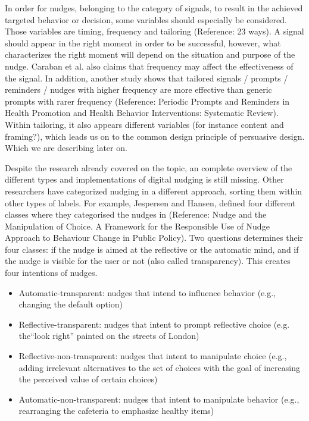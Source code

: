 In order for nudges, belonging to the category of signals, to result in the achieved targeted  behavior or decision, some variables should especially be considered. Those variables are timing, frequency and tailoring (Reference: 23 ways). A signal should appear in the right moment in order to be successful, however, what characterizes the right moment will depend on the situation and purpose of the nudge. Caraban et al. also claims that frequency may affect the effectiveness of the signal. In addition, another study shows that tailored signals / prompts / reminders / nudges with higher frequency are more effective than generic prompts with rarer frequency (Reference: Periodic Prompts and Reminders in Health Promotion and Health Behavior Interventions: Systematic Review). Within tailoring, it also appears different variables (for instance content and framing?), which leads us on to the common design principle of persuasive design. Which we are describing later on.  

Despite the research already covered on the topic, an complete overview of the different types and implementations of digital nudging is still missing. Other researchers have categorized nudging in a different approach, sorting them within other types of labels. For example, Jespersen and Hansen, defined four different classes where they categorised the nudges in (Reference: Nudge and the Manipulation of Choice. A Framework for the Responsible Use of Nudge Approach to Behaviour Change in Public Policy). Two questions determines their four classes: if the nudge is aimed at the reflective or the automatic mind, and if the nudge is visible for the user or not (also called transparency). This creates four intentions of nudges. 
\begin{itemize}
\item Automatic-transparent: nudges that intend to influence behavior (e.g., changing the default option)
\item Reflective-transparent: nudges that intent to prompt reflective choice (e.g. the“look right” painted on the streets of London)
\item Reflective-non-transparent: nudges that intent to manipulate choice (e.g., adding irrelevant alternatives to the set of choices with the goal of increasing the perceived value of certain choices)
\item Automatic-non-transparent: nudges that intent to manipulate behavior (e.g., rearranging the cafeteria to emphasize healthy items)
\end{itemize}

